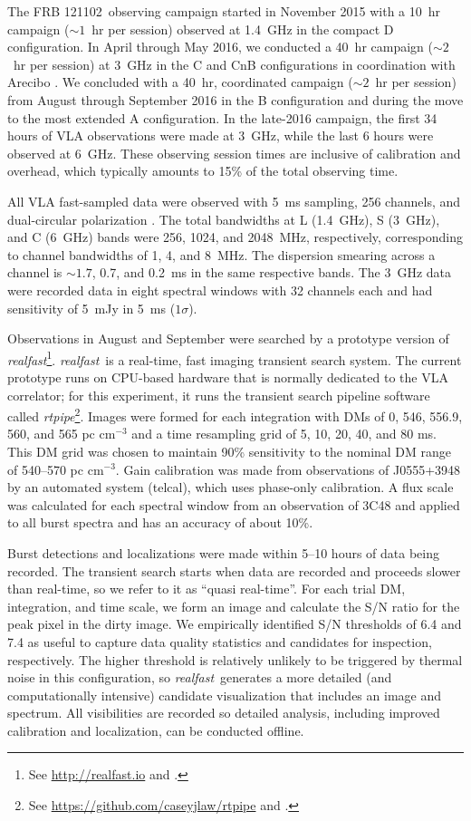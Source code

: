\documentclass[twocolumn]{aastex61}
\newcommand{\rf}{\emph{realfast}}
\newcommand{\frb}{FRB 121102}
\begin{document}
The \frb\ observing campaign started in November 2015 with a 10~hr campaign ($\sim1$~hr per session) observed at 1.4~GHz in the compact D configuration. In April through May 2016, we conducted a 40~hr campaign ($\sim2$~hr per session) at 3~GHz in the C and CnB configurations in coordination with Arecibo \citep{2016arXiv160308880S}. We concluded with a 40~hr, coordinated campaign ($\sim2$~hr per session) from August through September 2016 in the B configuration and during the move to the most extended A configuration. In the late-2016 campaign, the first 34 hours of VLA observations were made at 3~GHz, while the last 6 hours were observed at 6~GHz. These observing session times are inclusive of calibration and overhead, which typically amounts to 15\% of the total observing time.

All VLA fast-sampled data were observed with 5~ms sampling, 256 channels, and dual-circular polarization \citep{2015ApJ...807...16L}. The total bandwidths at L (1.4~GHz), S (3~GHz), and C (6~GHz) bands were 256, 1024, and 2048~MHz, respectively, corresponding to channel bandwidths of  1, 4, and 8~MHz. The dispersion smearing across a channel is $\sim1.7$, 0.7, and 0.2~ms in the same respective bands. The 3~GHz data were recorded data in eight spectral windows with 32 channels each and had sensitivity of 5~mJy in 5~ms ($1\sigma$).

Observations in August and September were searched by a prototype version of \rf\footnote{See \url{http://realfast.io} and \citep{2017AAS...22933002L}.}. \rf\ is a real-time, fast imaging transient search system. The current prototype runs on CPU-based hardware that is normally dedicated to the VLA correlator; for this experiment, it runs the transient search pipeline software called \emph{rtpipe}\footnote{See \url{https://github.com/caseyjlaw/rtpipe} and \citet{2015ApJ...807...16L}.}. Images were formed for each integration with DMs of 0, 546, 556.9, 560, and 565 pc cm$^{-3}$ and a time resampling grid of 5, 10, 20, 40, and 80 ms. This DM grid was chosen to maintain 90\% sensitivity to the nominal DM range of 540--570 pc cm$^{-3}$. Gain calibration was made from observations of J0555+3948 by an automated system (telcal), which uses phase-only calibration. A flux scale was calculated for each spectral window from an observation of 3C48 and applied to all burst spectra and has an accuracy of about 10\%.

Burst detections and localizations were made within 5--10 hours of data being recorded. The transient search starts when data are recorded and proceeds slower than real-time, so we refer to it as ``quasi real-time''. For each trial DM, integration, and time scale, we form an image and calculate the S/N ratio for the peak pixel in the dirty image. We empirically identified S/N thresholds of 6.4 and 7.4 as useful to capture data quality statistics and candidates for inspection, respectively. The higher threshold is relatively unlikely to be triggered by thermal noise in this configuration, so \rf\ generates a more detailed (and computationally intensive) candidate visualization that includes an image and spectrum. All visibilities are recorded so detailed analysis, including improved calibration and localization, can be conducted offline. 
\end{document}
